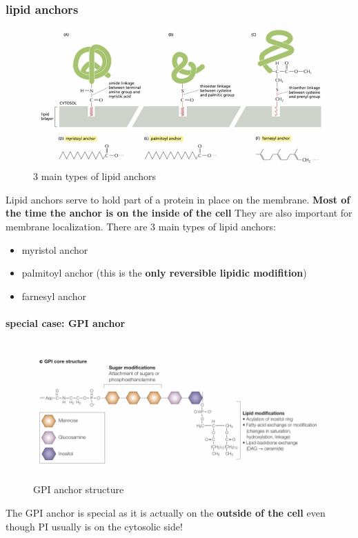 \documentclass[../main.tex]{subfiles}
\begin{document}
\subsubsection{lipid anchors}
\begin{figure}[H]
    \centering
    \includegraphics[width=0.5\linewidth]{Sum_Cell_Bio_II//lectures//cbII2/lipid_anchors.png}
    \caption{3 main types of lipid anchors}
    \label{fig:enter-label}
\end{figure}
Lipid anchors serve to hold part of a protein in place on the membrane. \textbf{Most of the time the anchor is on the inside of the cell} They are also important for membrane localization. There are 3 main types of lipid anchors:
\begin{itemize}
    \item myristol anchor
    \item palmitoyl anchor (this is the \textbf{only reversible lipidic modifition})
    \item farnesyl anchor
    
\end{itemize}

\paragraph{special case: GPI anchor}

\begin{figure}[H]
    \centering
    \includegraphics[width=\linewidth]{GPI.png}
    \caption{GPI anchor structure}
    \label{fig:enter-label}
\end{figure}
The GPI anchor is special as it is actually on the \textbf{outside of the cell} even though PI usually is on the cytosolic side! 
\end{document}
